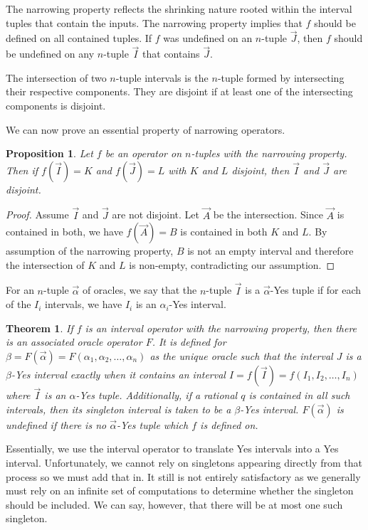 \documentclass[12pt]{article}
\newtheorem{theorem}{Theorem}
\newtheorem{proposition}{Proposition}
\theoremstyle{remark}
\begin{document}
The narrowing property reflects the shrinking nature rooted within the interval tuples that contain the inputs. The narrowing property implies that $f$ should be defined on all contained tuples. If $f$ was undefined on an $n$-tuple $\vec{J}$, then $f$ should be undefined on any $n$-tuple $\vec{I}$ that contains $\vec{J}$. 



The intersection of two $n$-tuple intervals is the $n$-tuple formed by intersecting their respective components. They are disjoint if at least one of the intersecting components is disjoint. 

We can now prove an essential property of narrowing operators. 

\begin{proposition} \label{pr:op-nrw}
Let $f$ be an operator on $n$-tuples with the narrowing property. Then if $f(\vec{I})=K$ and $f(\vec{J}) = L$ with $K$ and $L$ disjoint, then $\vec{I}$ and $\vec{J}$ are disjoint.
\end{proposition}

\begin{proof}
Assume $\vec{I}$ and $\vec{J}$ are not disjoint. Let $\vec{A}$ be the intersection. Since $\vec{A}$ is contained in both, we have $f(\vec A)= B$ is contained in both $K$ and $L$. By assumption of the narrowing property, $B$ is not an empty interval and therefore the intersection of $K$ and $L$ is non-empty, contradicting our assumption. 
\end{proof}

For an $n$-tuple $\vec{\alpha}$ of oracles, we say that the $n$-tuple $\vec{I}$ is a $\vec{\alpha}$-Yes tuple if for each of the $I_i$ intervals, we have $I_i$ is an $\alpha_i$-Yes interval. 

\begin{theorem}
If $f$ is an interval operator with the narrowing property, then there is an associated oracle operator $F$. It is defined for $\beta = F(\vec{\alpha}) = F(\alpha_1, \alpha_2, \ldots, \alpha_n)$ as the unique oracle such that the interval $J$ is a $\beta$-Yes interval exactly when it contains an interval $I = f(\vec{I}) = f(I_1, I_2, \ldots, I_n)$ where $\vec{I}$ is an $\alpha$-Yes tuple. Additionally, if a rational $q$ is contained in all such intervals, then its singleton interval is taken to be a $\beta$-Yes interval. $F(\vec{\alpha})$ is undefined if there is no $\vec{\alpha}$-Yes tuple which $f$ is defined on. 
\end{theorem}

Essentially, we use the interval operator to translate Yes intervals into a Yes interval. Unfortunately, we cannot rely on singletons appearing directly from that process so we must add that in. It still is not entirely satisfactory as we generally must rely on an infinite set of computations to determine whether the singleton should be included. We can say, however, that there will be at most one such singleton. 
\end{document}
